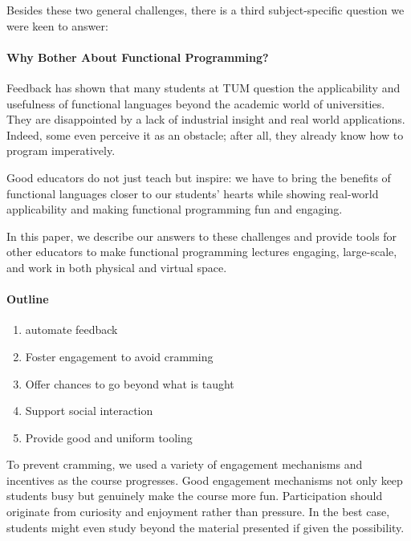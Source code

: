 \vspace{\baselineskip}\noindent
Besides these two general challenges,
there is a third subject-specific
question we were keen to answer:

\paragraph{Why Bother About Functional Programming?}
Feedback has shown that many students
at TUM question the applicability and usefulness
of functional languages beyond
the academic world of universities.
They are disappointed by a lack of industrial insight
and real world applications.
Indeed, some even perceive it as an obstacle;
after all, they already know how to program imperatively.

Good educators do not just teach but inspire:
we have to bring the benefits of functional languages
closer to our students' hearts
while showing real-world applicability and making functional programming fun and engaging.


\vspace{\baselineskip}\noindent
In this paper,
we describe our answers to these challenges
and provide tools for other educators
to make functional programming lectures engaging,
large-scale, and work in both physical and virtual space.

\paragraph{Outline}
\begin{enumerate}
\item automate feedback
\item Foster engagement to avoid cramming
\item Offer chances to go beyond what is taught
\item Support social interaction
\item Provide good and uniform tooling
\end{enumerate}

To prevent cramming,
we used a variety of engagement mechanisms and incentives as the course progresses.
Good engagement mechanisms not only keep students busy
but genuinely make the course more fun.
Participation should originate from curiosity and enjoyment rather than pressure.
In the best case, students might even study beyond the material presented
if given the possibility.

